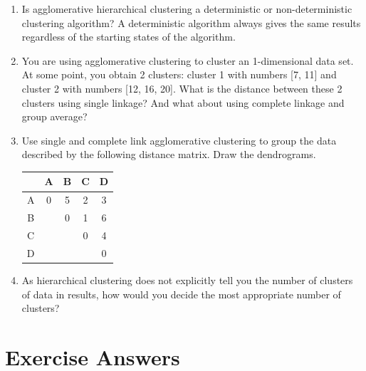 \begin{enumerate}
\item Is agglomerative hierarchical clustering a deterministic or non-deterministic clustering algorithm? A deterministic algorithm always gives the same results regardless of the starting states of the algorithm. \\

\item You are using agglomerative clustering to cluster an 1-dimensional data set. At some point, you obtain 2 clusters: cluster 1 with numbers [7, 11] and cluster 2 with numbers [12, 16, 20]. What is the distance between these 2 clusters using single linkage? And what about using complete linkage and group average? \\

\item Use single and complete link agglomerative clustering to group the data described by the following distance matrix. Draw the dendrograms.

\begin{center}
\begin{tabular}{| c | c | c | c | c |}
\hline 
 & A & B & C & D \\ \hline
A & 0 & 5 & 2 & 3 \\  \hline
B & & 0 & 1 & 6 \\ \hline
C & & & 0 & 4 \\ \hline
D & & & & 0   \\ \hline
\end{tabular}
\end{center}

\item As hierarchical clustering does not explicitly tell you the number of clusters of data in results, how would you decide the most appropriate number of clusters?

\end{enumerate}

\section*{Exercise Answers}

